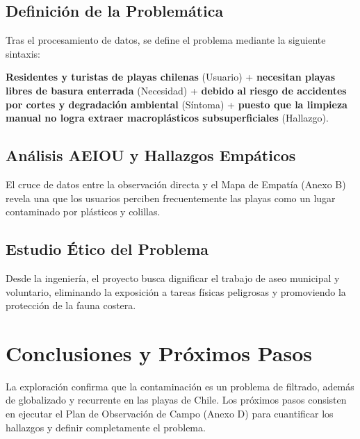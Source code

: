 \documentclass[12pt]{article}
\begin{document}
\subsection{Definición de la Problemática}
Tras el procesamiento de datos, se define el problema mediante la siguiente sintaxis:

\begin{tcolorbox}[colback=white, colframe=black, arc=0mm, sharp corners, boxrule=0.5pt, left=10pt, right=10pt, top=10pt, bottom=10pt]
\centering
\textbf{Residentes y turistas de playas chilenas} (Usuario) + \textbf{necesitan playas libres de basura enterrada} (Necesidad) + \textbf{debido al riesgo de accidentes por cortes y degradación ambiental} (Síntoma) + \textbf{puesto que la limpieza manual no logra extraer macroplásticos subsuperficiales} (Hallazgo).
\end{tcolorbox}

\subsection{Análisis AEIOU y Hallazgos Empáticos}
El cruce de datos entre la observación directa y el Mapa de Empatía (Anexo B) revela una que los usuarios perciben frecuentemente las playas como un lugar contaminado por plásticos y colillas.

\subsection{Estudio Ético del Problema}
Desde la ingeniería, el proyecto busca dignificar el trabajo de aseo municipal y voluntario, eliminando la exposición a tareas físicas peligrosas y promoviendo la protección de la fauna costera. 

\section{Conclusiones y Próximos Pasos}
La exploración confirma que la contaminación es un problema de filtrado, además de globalizado y recurrente en las playas de Chile. Los próximos pasos consisten en ejecutar el Plan de Observación de Campo (Anexo D) para cuantificar los hallazgos y definir completamente el problema.


\newpage
\end{document}
